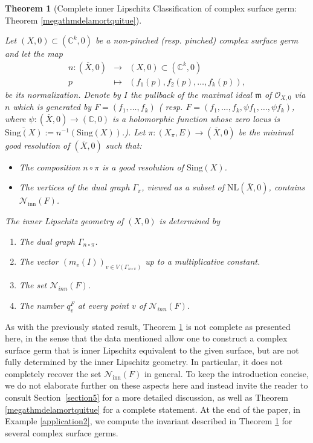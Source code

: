 \documentclass[reqno,dvipsnames,12pt]{amsart}
\newtheorem{theorem}{Theorem}[section]
\begin{document}
\begin{theorem}[Complete inner Lipschitz  Classification of complex surface germ: Theorem \ref{megathmdelamortquitue}]\label{megathmdelamortquitue'}




Let $(X,0) \subset (\mathbb{C}^k,0)$ be a  non-pinched  (resp. pinched) complex surface germ and let the map 
\[
\begin{array}{ccc}
n:(\overline{X},0) & \longrightarrow & (X,0) \subset (\mathbb{C}^k,0) \\
p & \longmapsto & (f_1(p),f_2(p),\dots,f_k(p)),
\end{array}
\]
be its normalization. Denote by $I$ the pullback of the maximal ideal $\mathfrak{m}$ of $\mathcal{O}_{X,0}$ via $n$ which is generated by $F=(f_1,\dots,f_k)$ ( resp. $F=(f_1,\dots,f_k,\psi f_1,\dots,\psi f_k)$, where $\psi:(\overline{X},0)\to(\mathbb{C},0)$ is a holomorphic function whose zero locus is $\overline{\mathrm{Sing}(X)}:=n^{-1}(\mathrm{Sing}(X))$.). Let $\pi : (X_{\pi},E) \longrightarrow (\overline{X},0)$ 
be the minimal good resolution of $(\overline{X},0)$ such that:

\begin{itemize}
    \item The composition $n \circ \pi$ is a good resolution of $\mathrm{Sing}(X)$.
    \item The vertices of the dual graph $\Gamma_{\pi}$, viewed as a subset of $\mathrm{NL}(\overline{X},0)$, contains $\mathcal{N}_{\mathrm{inn}}(F)$.
\end{itemize}




The inner Lipschitz geometry of $(X,0)$ is determined by
 \begin{enumerate}
	\item The dual graph $\Gamma_{n \circ \pi }$.
	\item The vector $(m_v(I))_{v \in V(\Gamma_{n \circ \pi} )}$ up to a multiplicative constant.
	\item The set $\mathcal{N}_{inn}(F)$.
	\item The number $q_v^{F}$ at every point $v$ of 	$\mathcal{N}_{inn}(F)$.	\end{enumerate}


  
\end{theorem}
As with the previously stated result, Theorem \ref{megathmdelamortquitue'} is not complete as presented here, in the sense that the data mentioned allow one to construct a complex surface germ that is inner Lipschitz equivalent to the given surface, but are not fully determined by the inner Lipschitz geometry. In particular, it does not completely recover the set $\mathcal{N}_{\mathrm{inn}}(F)$ in general. To keep the introduction concise, we do not elaborate further on these aspects here and instead invite the reader to consult Section~\ref{section5} for a more detailed discussion, as well as Theorem \ref{megathmdelamortquitue} for a complete statement. At the end of the paper, in Example \ref{application2}, we compute the invariant described in Theorem \ref{megathmdelamortquitue'} for several complex surface germs.
\end{document}
